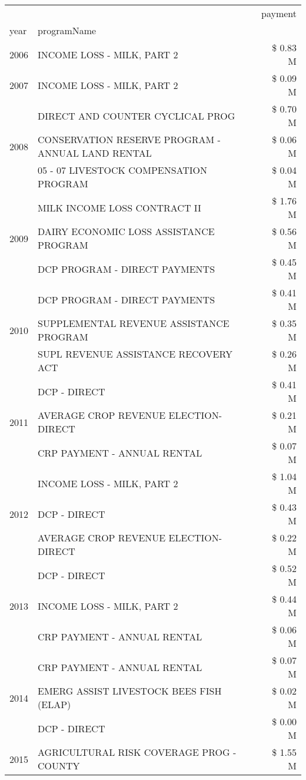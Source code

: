 \begin{tabular}{llr}
\toprule
 &  & payment \\
year & programName &  \\
\midrule
2006 & INCOME LOSS - MILK, PART 2 & \$ 0.83 M \\
\cline{1-3}
2007 & INCOME LOSS - MILK, PART 2 & \$ 0.09 M \\
\cline{1-3}
\multirow[t]{3}{*}{2008} & DIRECT AND COUNTER CYCLICAL PROG & \$ 0.70 M \\
 & CONSERVATION RESERVE PROGRAM - ANNUAL LAND RENTAL & \$ 0.06 M \\
 & 05 - 07 LIVESTOCK COMPENSATION PROGRAM & \$ 0.04 M \\
\cline{1-3}
\multirow[t]{3}{*}{2009} & MILK INCOME LOSS CONTRACT II & \$ 1.76 M \\
 & DAIRY ECONOMIC LOSS ASSISTANCE PROGRAM & \$ 0.56 M \\
 & DCP PROGRAM - DIRECT PAYMENTS & \$ 0.45 M \\
\cline{1-3}
\multirow[t]{3}{*}{2010} & DCP PROGRAM - DIRECT PAYMENTS & \$ 0.41 M \\
 & SUPPLEMENTAL REVENUE ASSISTANCE PROGRAM & \$ 0.35 M \\
 & SUPL REVENUE ASSISTANCE RECOVERY ACT & \$ 0.26 M \\
\cline{1-3}
\multirow[t]{3}{*}{2011} & DCP - DIRECT & \$ 0.41 M \\
 & AVERAGE CROP REVENUE ELECTION-DIRECT & \$ 0.21 M \\
 & CRP PAYMENT - ANNUAL RENTAL & \$ 0.07 M \\
\cline{1-3}
\multirow[t]{3}{*}{2012} & INCOME LOSS - MILK, PART 2 & \$ 1.04 M \\
 & DCP - DIRECT & \$ 0.43 M \\
 & AVERAGE CROP REVENUE ELECTION-DIRECT & \$ 0.22 M \\
\cline{1-3}
\multirow[t]{3}{*}{2013} & DCP - DIRECT & \$ 0.52 M \\
 & INCOME LOSS - MILK, PART 2 & \$ 0.44 M \\
 & CRP PAYMENT - ANNUAL RENTAL & \$ 0.06 M \\
\cline{1-3}
\multirow[t]{3}{*}{2014} & CRP PAYMENT - ANNUAL RENTAL & \$ 0.07 M \\
 & EMERG ASSIST LIVESTOCK BEES FISH (ELAP) & \$ 0.02 M \\
 & DCP - DIRECT & \$ 0.00 M \\
\cline{1-3}
\multirow[t]{3}{*}{2015} & AGRICULTURAL RISK COVERAGE PROG - COUNTY & \$ 1.55 M \\

\end{tabular}
